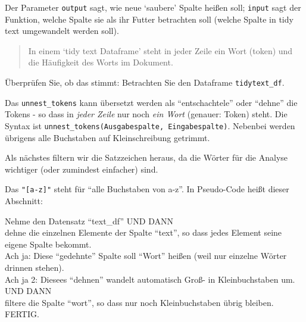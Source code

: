 \documentclass[12pt,ngerman,]{book}
\makeatletter
\newenvironment{Shaded}{\begin{snugshade}}{\end{snugshade}}
\newcommand{\KeywordTok}[1]{\textcolor[rgb]{0.13,0.29,0.53}{\textbf{{#1}}}}
\newcommand{\StringTok}[1]{\textcolor[rgb]{0.31,0.60,0.02}{{#1}}}
\newcommand{\CommentTok}[1]{\textcolor[rgb]{0.56,0.35,0.01}{\textit{{#1}}}}
\newcommand{\NormalTok}[1]{{#1}}
\newenvironment{kframe}{%
\medskip{}
\setlength{\fboxsep}{.8em}
 \def\at@end@of@kframe{}%
 \ifinner\ifhmode%
  \def\at@end@of@kframe{\end{minipage}}%
  \begin{minipage}{\columnwidth}%
 \fi\fi%
 \def\FrameCommand##1{\hskip\@totalleftmargin \hskip-\fboxsep
 \colorbox{shadecolor}{##1}\hskip-\fboxsep
     \hskip-\linewidth \hskip-\@totalleftmargin \hskip\columnwidth}%
 \MakeFramed {\advance\hsize-\width
   \@totalleftmargin\z@ \linewidth\hsize
   \@setminipage}}%
 {\par\unskip\endMakeFramed%
 \at@end@of@kframe}
\renewenvironment{Shaded}{\begin{kframe}}{\end{kframe}}
\theoremstyle{definition}
\theoremstyle{definition}
\theoremstyle{remark}
\let\BeginKnitrBlock\begin \let\EndKnitrBlock\end
\makeatother
\begin{document}
Der Parameter \texttt{output} sagt, wie neue `saubere' Spalte heißen
soll; \texttt{input} sagt der Funktion, welche Spalte sie als ihr Futter
betrachten soll (welche Spalte in tidy text umgewandelt werden soll).

\begin{quote}
In einem `tidy text Dataframe' steht in jeder Zeile ein Wort (token) und
die Häufigkeit des Worts im Dokument.
\end{quote}

Überprüfen Sie, ob das stimmt: Betrachten Sie den Dataframe
\texttt{tidytext\_df}.

Das \texttt{unnest\_tokens} kann übersetzt werden als ``entschachtele''
oder ``dehne'' die Tokens - so dass in \emph{jeder Zeile} nur noch
\emph{ein Wort} (genauer: Token) steht. Die Syntax ist
\texttt{unnest\_tokens(Ausgabespalte,\ Eingabespalte)}. Nebenbei werden
übrigens alle Buchstaben auf Kleinschreibung getrimmt.

Als nächstes filtern wir die Satzzeichen heraus, da die Wörter für die
Analyse wichtiger (oder zumindest einfacher) sind.

\begin{Shaded}
\end{Shaded}

Das \texttt{"{[}a-z{]}"} steht für ``alle Buchstaben von a-z''. In
Pseudo-Code heißt dieser Abschnitt:

\BeginKnitrBlock{rmdpseudocode}
Nehme den Datensatz ``text\_df'' UND DANN\\
dehne die einzelnen Elemente der Spalte ``text'', so dass jedes Element
seine eigene Spalte bekommt.\\
Ach ja: Diese ``gedehnte'' Spalte soll ``Wort'' heißen (weil nur
einzelne Wörter drinnen stehen).\\
Ach ja 2: Diesees ``dehnen'' wandelt automatisch Groß- in
Kleinbuchstaben um. UND DANN\\
filtere die Spalte ``wort'', so dass nur noch Kleinbuchstaben übrig
bleiben. FERTIG.
\EndKnitrBlock{rmdpseudocode}
\end{document}
